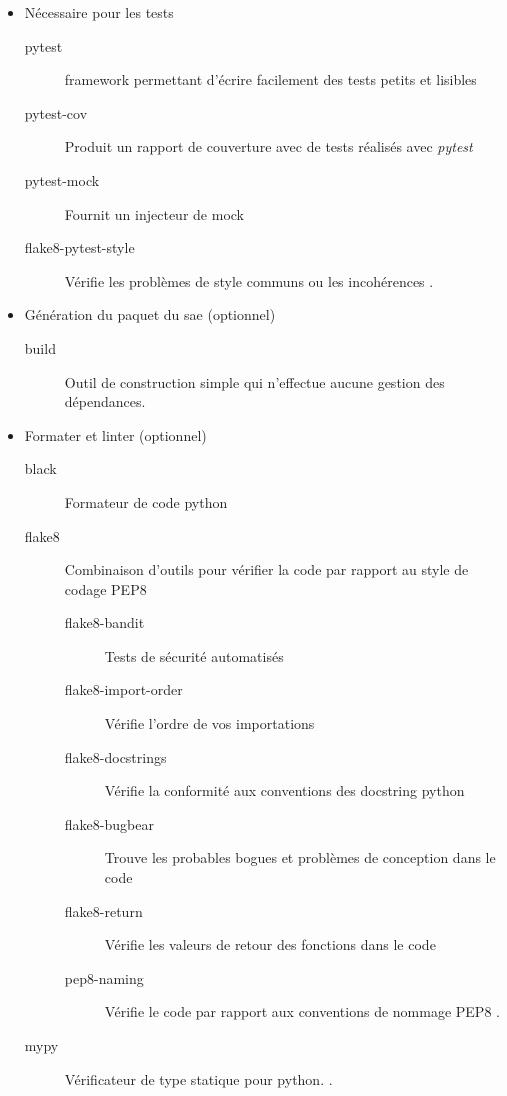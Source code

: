 \begin{itemize}
    \item Nécessaire pour les tests
          \begin{description}
              \item[pytest] \Gls{framework} permettant d'écrire facilement des tests petits et lisibles \cite{pytest}
              \item[pytest-cov] Produit un rapport de couverture avec de tests réalisés avec \textit{pytest} \cite{pytest_cov}
              \item[pytest-mock] Fournit un injecteur de \gls{mock} \cite{pytest_mock}
              \item[flake8-pytest-style]
                  Vérifie les problèmes de style communs ou les incohérences \cite{flake8_pytest_style}.
          \end{description}

    \item Génération du \gls{paquet} du \gls{sae} (optionnel)
          \begin{description}
              \item[build] Outil de construction simple qui n'effectue aucune gestion des dépendances. \cite{build}
          \end{description}

    \item Formater et linter (optionnel)
          \begin{description}
              \item[black] Formateur de code \gls{python} \cite{black}
              \item[flake8] Combinaison d'outils pour vérifier la code par rapport au style de codage PEP8
                  \cite{flake8, pep8}
                  \begin{description}
                      \item[flake8-bandit] Tests de sécurité automatisés \cite{flake8_bandit}
                      \item[flake8-import-order] Vérifie l'ordre de vos importations \cite{flake8_import_order}
                      \item[flake8-docstrings] Vérifie la conformité aux conventions des \gls{docstring} \gls{python}
                          \cite{flake8_docstrings}
                      \item[flake8-bugbear] Trouve les probables bogues et problèmes de conception dans le code
                          \cite{flake8_bugbear}
                      \item[flake8-return] Vérifie les valeurs de retour des fonctions dans le code \cite{flake8_return}
                      \item[pep8-naming] Vérifie le code par rapport aux conventions de nommage PEP8 \cite{pep8_naming, pep8}.
                  \end{description}
              \item[mypy]
                  Vérificateur de type statique pour \gls{python}. \cite{mypy}.
          \end{description}
\end{itemize}

